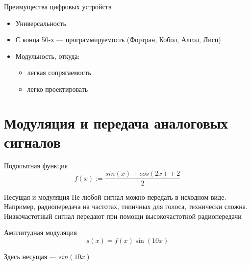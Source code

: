 \documentclass[xetex,aspectratio=43]{beamer}
\begin{document}
\begin{frame}{Преимущества цифровых устройств}
	\begin{itemize}
		
		\item
		Универсальность
		\item
		С конца 50-х --- программируемость (Фортран, Кобол, Алгол, Лисп)
		\item
		Модульность, откуда:
		
		\begin{itemize}
			
			\item
			легкая сопрягаемость
			\item
			легко проектировать
		\end{itemize}
	\end{itemize}
\end{frame}

\section{Модуляция и передача аналоговых сигналов}

\begin{frame}{Подопытная функция}
	\[f(x) := \frac{sin(x) +cos(2x) +2}{2}\]

	\begin{center}
		
	\end{center}
\end{frame}

\begin{frame}{Несущая и модуляция}
	Не любой сигнал можно передать в исходном виде. Например, радиопередача
	на частотах, типичных для голоса, технически сложна. Низкочастотный
	сигнал передают при помощи высокочастотной радиопередачи
	
	\pause
	
	
\end{frame}

\begin{frame}{Амплитудная модуляция}
	\[s(x) = f(x)\sin(10 x)\]
	
	\begin{center}
		
	\end{center}
	
	Здесь несущая --- \(sin(10 x)\)
\end{frame}
\end{document}
